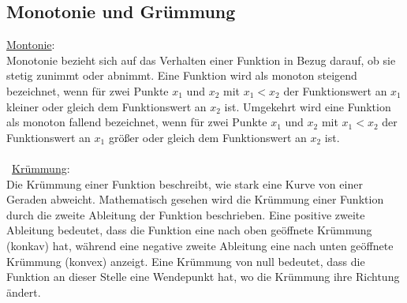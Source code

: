 \subsection{Monotonie und Grümmung}
\underline{Montonie}: \\
Monotonie bezieht sich auf das Verhalten einer Funktion in Bezug darauf, 
ob sie stetig zunimmt oder abnimmt. 
Eine Funktion wird als monoton steigend bezeichnet, 
wenn für zwei Punkte $x_1$ und $x_2$ mit $x_1 < x_2$ der Funktionswert an $x_1$ kleiner oder gleich dem Funktionswert an $x_2$ ist. 
Umgekehrt wird eine Funktion als monoton fallend bezeichnet, 
wenn für zwei Punkte $x_1$ und $x_2$ mit $x_1<x_2$ der Funktionswert an $x_1$ größer oder gleich dem Funktionswert an $x_2$ ist. \\\\
\
\underline{Krümmung}: \\
Die Krümmung einer Funktion beschreibt, wie stark eine Kurve von einer Geraden abweicht. 
Mathematisch gesehen wird die Krümmung einer Funktion durch die zweite Ableitung der Funktion beschrieben. 
Eine positive zweite Ableitung bedeutet, 
dass die Funktion eine nach oben geöffnete Krümmung (konkav) hat, 
während eine negative zweite Ableitung eine nach unten geöffnete Krümmung (konvex) anzeigt. 
Eine Krümmung von null bedeutet, dass die Funktion an dieser Stelle eine Wendepunkt hat, 
wo die Krümmung ihre Richtung ändert.
